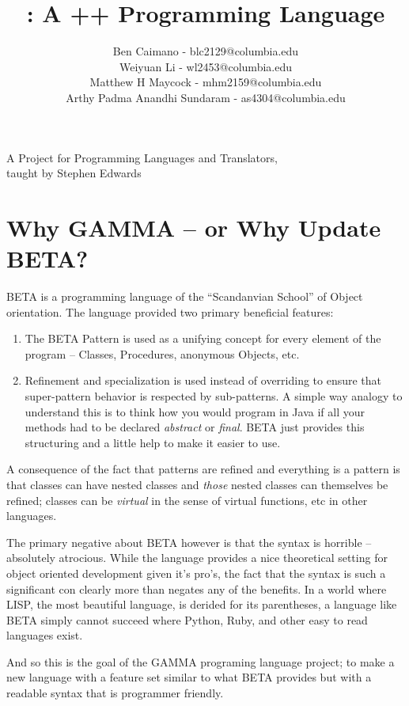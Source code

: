 \documentclass[10pt]{article}
\title{\Lang{}: A \OLang{}++ Programming Language}
\author{
	Ben Caimano - blc2129@columbia.edu \\
	Weiyuan Li - wl2453@columbia.edu \\
	Matthew H Maycock - mhm2159@columbia.edu \\
	Arthy Padma Anandhi Sundaram - as4304@columbia.edu
}
\date{}
\newcommand{\Lang}{GAMMA}
\newcommand{\OLang}{BETA}
\begin{document}
\maketitle
\begin{center}
\large
A Project for Programming Languages and Translators,
\\taught by Stephen Edwards
\end{center}


\section*{Why \Lang{} -- or Why Update \OLang{}?}
\OLang{} is a programming language of the ``Scandanvian School'' of Object
orientation. The language provided two primary beneficial features:

\begin{enumerate}
\item The \OLang{} Pattern is used as a unifying concept for every element
of the program -- Classes, Procedures, anonymous Objects, etc.
\item Refinement and specialization is used instead of overriding to
ensure that super-pattern behavior is respected by sub-patterns. A
simple way analogy to understand this is to think how you would program
in Java if all your methods had to be declared \emph{abstract} or
\emph{final}. \OLang{} just provides this structuring and a little help to
make it easier to use.
\end{enumerate}

A consequence of the fact that patterns are refined and everything is a
pattern is that classes can have nested classes and \emph{those} nested
classes can themselves be refined; classes can be \emph{virtual} in the
sense of virtual functions, etc in other languages.

The primary negative about \OLang{} however is that the syntax is horrible
-- absolutely atrocious. While the language provides a nice theoretical
setting for object oriented development given it's pro's, the fact that
the syntax is such a significant con clearly more than negates any of
the benefits. In a world where LISP, the most beautiful language, is
derided for its parentheses, a language like \OLang{} simply cannot succeed
where Python, Ruby, and other easy to read languages exist.

And so this is the goal of the \Lang{} programing language project; to
make a new language with a feature set similar to what \OLang{} provides
but with a readable syntax that is programmer friendly.
\end{document}
